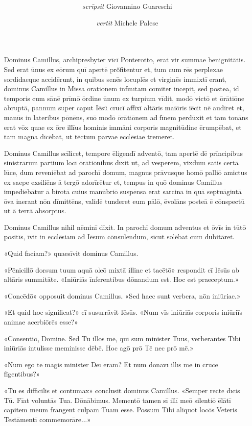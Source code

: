 \documentclass[a4paper, 12pt]{article}
\title{
	\MyTitle
}
\author{\textit{scrīpsit} Giovannino Guareschi \and \textit{vertit} Michele Palese}
\date{}
\begin{document}
	
	\maketitle
	
	Dominus Camillus, archipresbyter vīcī Ponterotto, erat vir summae benignitātis.
	Sed erat ūnus ex eōrum quī apertē prŏfitentur et, tum cum rēs perplexae sordidaeque accidērunt, in quibus senēs locuplēs et virginēs immixtī erant, dominus Camillus in Missā ōrātiōnem infīnītam comiter incēpit, sed posteā, id temporis cum sānē prīmō ōrdine ūnum ex turpium vīdit, modō victō et ōrātiōne abruptā, pannum super caput Iēsū crucī affīxī altāris maiōris iēcit nē audīret et, manūs in lateribus pōnēns, suō modō ōrātiōnem ad fīnem perdūxit et tam tonāns erat vōx quae ex ōre illīus hominis immāni corporis magnitūdine ērumpēbat, et tam magna dīcēbat, ut tēctum parvae ecclēsiae tremeret.
	
	Dominus Camillus scīlicet, tempore ēligendī adventō, tam apertē dē prīncipibus sinistrārum partium locī ōrātiōnibus dīxit ut, ad vesperem, vixdum satis certā lūce, dum reveniēbat ad parochī domum, magnus prāvusque homō palliō amictus ex saepe exsiliēns ā tergō adorīrētur et, tempus in quō dominus Camillus impediēbātur ā birotā cuius manūbriō suspēnsa erat sarcina in quā septuāgintā ōva inerant nōn dīmittēns, validē tunderet eum pālō, ēvolāns posteā ē cōnspectū ut ā terrā absorptus.
	
	Dominus Camillus nihil nēminī dīxit.
	In parochī domum adventus et ōvīs in tūtō positīs, īvit in ecclēsiam ad Iēsum cōnsulendum, sīcut solēbat cum dubitāret.
	
	«Quid faciam?» quaesīvit dominus Camillus.
	
	«Pēnicillō dorsum tuum aquā oleō mixtā illine et tacētō» respondit eī Iēsūs ab altāris summitāte.
	«Iniūriās īnferentibus dōnandum est. Hoc est praeceptum.»
	
	«Concēdō» opposuit dominus Camillus.
	«Sed haec sunt verbera, nōn iniūriae.»
	
	«Et quid hoc significat?» eī susurrāvit Iēsūs.
	«Num vīs iniūriās corporis iniūriīs animae acerbiōrēs esse?»
	
	«Cōnsentiō, Domine.
	Sed Tū illōs mē, quī sum minister Tuus, verberantēs Tibi iniūriās intulisse meminisse dēbē.
	Hoc agō prō Tē nec prō mē.»
	
	«Num ego tē magis minister Deī eram?
	Et num dōnāvī illīs mē in cruce fīgentibus?»
	
	«Tū es difficilis et contumāx» conclūsit dominus Camillus.
	«Semper rēctē dīcis Tū.
	Fīat voluntās Tua.
	Dōnābimus.
	Mementō tamen sī illī meō silentiō ēlātī capitem meum frangent culpam Tuam esse.
	Possum Tibi aliquot locōs Veteris Testāmentī commemorāre...»
	
\end{document}
